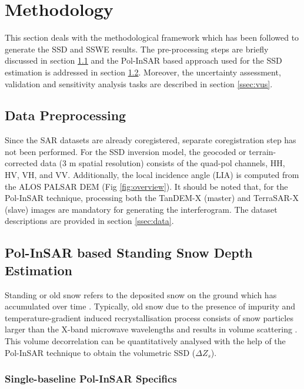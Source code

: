 \documentclass[12pt]{elsarticle}
\numberwithin{equation}{section}
\numberwithin{figure}{section}
\numberwithin{table}{section}
\begin{document}
\section{Methodology}
\label{sec:method}

This section deals with the methodological framework which has been followed to generate the SSD and SSWE results. The pre-processing steps are briefly discussed in section \ref{ssec:pre} and the Pol-InSAR based approach used for the SSD estimation is addressed in section \ref{ssec:ssd}. Moreover, the uncertainty assessment, validation and sensitivity analysis tasks are described in section \ref{ssec:vus}.

\subsection{Data Preprocessing}
\label{ssec:pre}

Since the SAR datasets are already coregistered, separate coregistration step has not been performed. For the SSD inversion model, the geocoded or terrain-corrected data (3 m spatial resolution) consists of the quad-pol channels, HH, HV, VH, and VV. Additionally, the local incidence angle (LIA) is computed from the ALOS PALSAR DEM (Fig \ref{fig:overview}). It should be noted that, for the Pol-InSAR technique, processing both the TanDEM-X (master) and TerraSAR-X (slave) images \citep{Balss2012} are mandatory for generating the interferogram. The dataset descriptions are provided in section \ref{ssec:data}. 

\subsection{Pol-InSAR based Standing Snow Depth Estimation}
\label{ssec:ssd}

Standing or old snow refers to the deposited snow on the ground which has accumulated over time \citep{Reynolds1983, Majumdar2019a}. Typically, old snow due to the presence of impurity and temperature-gradient induced recrystallisation process consists of snow particles larger than the X-band microwave wavelengths and results in volume scattering \citep{Leinss2016, Riche2013}. This volume decorrelation can be quantitatively analysed with the help of the Pol-InSAR technique \citep{Cloude2010} to obtain the volumetric SSD ($\Delta{Z_s}$). 

\subsubsection{Single-baseline Pol-InSAR Specifics}
\end{document}
